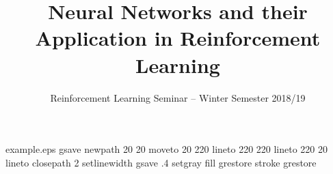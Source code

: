 %
%
%
%
%
\begin{filecontents*}{example.eps}
    gsave
    newpath
    20 20 moveto
    20 220 lineto
    220 220 lineto
    220 20 lineto
    closepath
    2 setlinewidth
    gsave
    .4 setgray fill
    grestore
    stroke
    grestore
\end{filecontents*}
%
\RequirePackage{fix-cm}
%
\documentclass{svjour3}                     %
%
\smartqed  %
%
\usepackage{graphicx}
\usepackage{amssymb}
\usepackage{amsmath}
%
%
%
%
%

\newcommand{\argmax}[1]{\underset{#1}{\operatorname{arg}\,\operatorname{max}}\;}



    \title{Neural Networks and their Application in Reinforcement Learning%
    }
    \subtitle{Reinforcement Learning Seminar -- Winter Semester 2018/19}


